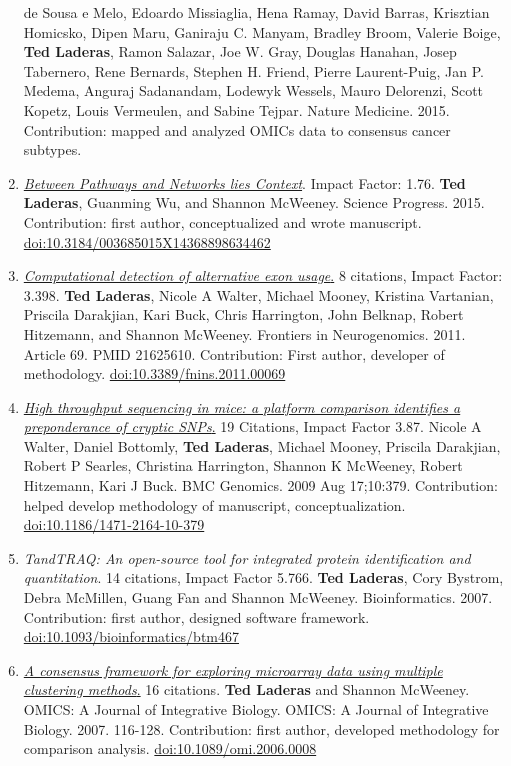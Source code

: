 \documentclass[11pt,]{article}
\begin{document}
\begin{enumerate}
  de Sousa e Melo, Edoardo Missiaglia, Hena Ramay, David Barras,
  Krisztian Homicsko, Dipen Maru, Ganiraju C. Manyam, Bradley Broom,
  Valerie Boige, \textbf{Ted Laderas}, Ramon Salazar, Joe W. Gray,
  Douglas Hanahan, Josep Tabernero, Rene Bernards, Stephen H. Friend,
  Pierre Laurent-Puig, Jan P. Medema, Anguraj Sadanandam, Lodewyk
  Wessels, Mauro Delorenzi, Scott Kopetz, Louis Vermeulen, and Sabine
  Tejpar. Nature Medicine. 2015. Contribution: mapped and analyzed OMICs
  data to consensus cancer subtypes.
\item
  \href{https://www.dropbox.com/s/70z4yp3k36y9bmu/laderast_between_pathways.pdf?dl=0}{\emph{Between
  Pathways and Networks lies Context}}. Impact Factor: 1.76. \textbf{Ted
  Laderas}, Guanming Wu, and Shannon McWeeney. Science Progress. 2015.
  Contribution: first author, conceptualized and wrote manuscript.
  \href{http://dx.doi.org/10.3184/003685015X14368898634462}{doi:10.3184/003685015X14368898634462}
\item
  \href{https://www.dropbox.com/s/t9ic1rpirja4xqv/computational-exon-laderas.pdf?dl=0}{\emph{Computational
  detection of alternative exon usage}.} 8 citations, Impact Factor:
  3.398. \textbf{Ted Laderas}, Nicole A Walter, Michael Mooney, Kristina
  Vartanian, Priscila Darakjian, Kari Buck, Chris Harrington, John
  Belknap, Robert Hitzemann, and Shannon McWeeney. Frontiers in
  Neurogenomics. 2011. Article 69. PMID 21625610. Contribution: First
  author, developer of methodology.
  \href{http://dx.doi.org/10.3389/fnins.2011.00069}{doi:10.3389/fnins.2011.00069}
\item
  \href{https://www.dropbox.com/s/2v0h7ufxu1664yt/preponderance-SNPs-walter-laderas.pdf?dl=0}{\emph{High
  throughput sequencing in mice: a platform comparison identifies a
  preponderance of cryptic SNPs}.} 19 Citations, Impact Factor 3.87.
  Nicole A Walter, Daniel Bottomly, \textbf{Ted Laderas}, Michael
  Mooney, Priscila Darakjian, Robert P Searles, Christina Harrington,
  Shannon K McWeeney, Robert Hitzemann, Kari J Buck. BMC Genomics. 2009
  Aug 17;10:379. Contribution: helped develop methodology of manuscript,
  conceptualization.
  \href{http://dx.doi.org/10.1186/1471-2164-10-379}{doi:10.1186/1471-2164-10-379}
\item
  \emph{TandTRAQ: An open-source tool for integrated protein
  identification and quantitation}. 14 citations, Impact Factor 5.766.
  \textbf{Ted Laderas}, Cory Bystrom, Debra McMillen, Guang Fan and
  Shannon McWeeney. Bioinformatics. 2007. Contribution: first author,
  designed software framework.
  \href{http://dx.doi.org/10.1093/bioinformatics/btm467}{doi:10.1093/bioinformatics/btm467}
\item
  \href{https://www.dropbox.com/s/v56bomf1ijhmds3/Laderas_McWeeney07.pdf?dl=0}{\emph{A
  consensus framework for exploring microarray data using multiple
  clustering methods}.} 16 citations. \textbf{Ted Laderas} and Shannon
  McWeeney. OMICS: A Journal of Integrative Biology. OMICS: A Journal of
  Integrative Biology. 2007. 116-128. Contribution: first author,
  developed methodology for comparison analysis.
  \href{http://dx.doi.org/10.1089/omi.2006.0008}{doi:10.1089/omi.2006.0008}
\end{enumerate}
\end{document}
